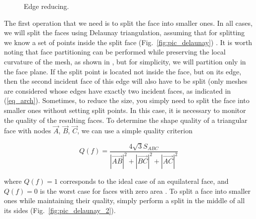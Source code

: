 \documentclass[
11pt,%
tightenlines,%
twoside,%
onecolumn,%
nofloats,%
nobibnotes,%
nofootinbib,%
superscriptaddress,%
noshowpacs,%
centertags]%
{revtex4}
\begin{document}
\begin{figure}[h]
\begin{minipage}[h]{0.28\textwidth}
    \caption{Edge reducing.}\label{fig:pic_reduce_edge}
  \end{minipage}
\end{figure}

The first operation that we need is to split the face into smaller ones.
In all cases, we will split the faces using Delaunay triangulation, assuming that for splitting we know a set of points inside the split face (Fig.~\ref{fig:pic_delaunay}) \cite{Rivara}.
It is worth noting that face partitioning can be performed while preserving the local curvature of the mesh, as shown in \cite{Rakotoarivelo}, but for simplicity, we will partition only in the face plane.
If the split point is located not inside the face, but on its edge, then the second incident face of this edge will also have to be split (only meshes are considered whose edges have exactly two incident faces, as indicated in (\ref{eq_arch}).
Sometimes, to reduce the size, you simply need to split the face into smaller ones without setting split points.
In this case, it is necessary to monitor the quality of the resulting faces.
To determine the shape quality of a triangular face with nodes $\vec{A}$, $\vec{B}$, $\vec{C}$, we can use a simple quality criterion

\begin{equation}
Q(f) = \frac{4\sqrt{3} S_{ABC}}{|\vec{AB}|^2 + |\vec{BC}|^2 + |\vec{AC}|^2}
\end{equation}

where $Q(f) = 1$ corresponds to the ideal case of an equilateral face, and $Q(f) = 0$ is the worst case for faces with zero area \cite{Borouchaki}.
To split a face into smaller ones while maintaining their quality, simply perform a split in the middle of all its sides (Fig.~\ref{fig:pic_delaunay_2}).
\end{document}
